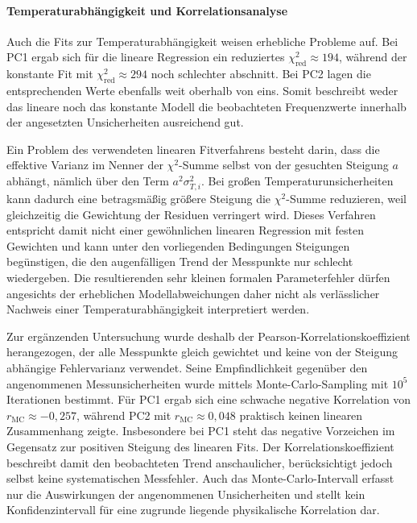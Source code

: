 \documentclass[11pt,a4paper]{article}
\begin{document}
\paragraph{Temperaturabhängigkeit und Korrelationsanalyse}
Auch die Fits zur Temperaturabhängigkeit weisen erhebliche Probleme auf. Bei PC1 ergab sich für die lineare Regression ein reduziertes $\chi^2_{\mathrm{red}}\approx194$, während der konstante Fit mit $\chi^2_{\mathrm{red}}\approx294$ noch schlechter abschnitt. Bei PC2 lagen die entsprechenden Werte ebenfalls weit oberhalb von eins. Somit beschreibt weder das lineare noch das konstante Modell die beobachteten Frequenzwerte innerhalb der angesetzten Unsicherheiten ausreichend gut.

Ein Problem des verwendeten linearen Fitverfahrens besteht darin, dass die effektive Varianz im Nenner der $\chi^2$-Summe selbst von der gesuchten Steigung $a$ abhängt, nämlich über den Term $a^2\sigma_{T,i}^2$. Bei großen Temperaturunsicherheiten kann dadurch eine betragsmäßig größere Steigung die $\chi^2$-Summe reduzieren, weil gleichzeitig die Gewichtung der Residuen verringert wird. Dieses Verfahren entspricht damit nicht einer gewöhnlichen linearen Regression mit festen Gewichten und kann unter den vorliegenden Bedingungen Steigungen begünstigen, die den augenfälligen Trend der Messpunkte nur schlecht wiedergeben. Die resultierenden sehr kleinen formalen Parameterfehler dürfen angesichts der erheblichen Modellabweichungen daher nicht als verlässlicher Nachweis einer Temperaturabhängigkeit interpretiert werden.

Zur ergänzenden Untersuchung wurde deshalb der Pearson-Korrelationskoeffizient herangezogen, der alle Messpunkte gleich gewichtet und keine von der Steigung abhängige Fehlervarianz verwendet. Seine Empfindlichkeit gegenüber den angenommenen Messunsicherheiten wurde mittels Monte-Carlo-Sampling mit $10^5$ Iterationen bestimmt. Für PC1 ergab sich eine schwache negative Korrelation von $r_{\mathrm{MC}}\approx-0{,}257$, während PC2 mit $r_{\mathrm{MC}}\approx0{,}048$ praktisch keinen linearen Zusammenhang zeigte. Insbesondere bei PC1 steht das negative Vorzeichen im Gegensatz zur positiven Steigung des linearen Fits. Der Korrelationskoeffizient beschreibt damit den beobachteten Trend anschaulicher, berücksichtigt jedoch selbst keine systematischen Messfehler. Auch das Monte-Carlo-Intervall erfasst nur die Auswirkungen der angenommenen Unsicherheiten und stellt kein Konfidenzintervall für eine zugrunde liegende physikalische Korrelation dar.
\end{document}
